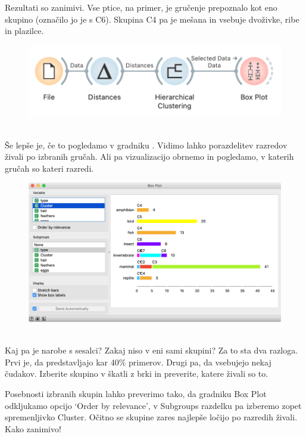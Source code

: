 \begin{figure}[h]
\end{figure}

\newpage

Rezultati so zanimivi. Vse ptice, na primer, je gručenje prepoznalo kot eno skupino (označilo jo je s C6). Skupina C4 pa je mešana in vsebuje dvoživke, ribe in plazilce.

\begin{figure}[h]
    \includegraphics[width=\linewidth]{workflow2.png}%
    \caption{$\;$}
\end{figure}

Še lepše je, če to pogledamo v gradniku . Vidimo lahko porazdelitev razredov živali po izbranih gručah. Ali pa vizualizacijo obrnemo in pogledamo, v katerih gručah so kateri razredi.

\begin{figure}[h]
    \includegraphics[width=\linewidth]{box-plot.png}%
    \caption{$\;$}
\end{figure}

Kaj pa je narobe s sesalci? Zakaj niso v eni sami skupini? Za to sta dva razloga. Prvi je, da predstavljajo kar 40\% primerov. Drugi pa, da vsebujejo nekaj čudakov. Izberite skupino v škatli z brki in preverite, katere živali so to.

Posebnosti izbranih skupin lahko preverimo tako, da gradniku Box Plot odkljukamo opcijo ‘Order by relevance’, v Subgroups razdelku pa izberemo zopet spremenljivko Cluster. Očitno se skupine zares najlepše ločijo po razredih živali. Kako zanimivo!

